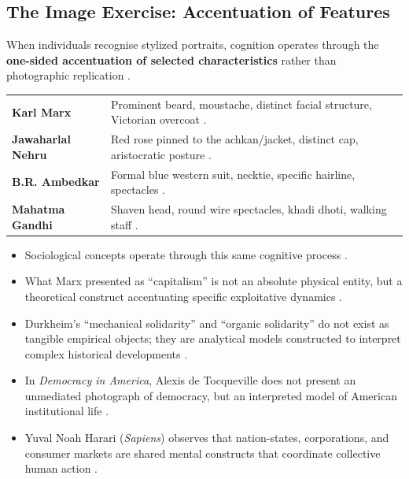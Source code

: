 \subsection{The Image Exercise: Accentuation of Features}

When individuals recognise stylized portraits, cognition operates through the \textbf{one-sided accentuation of selected characteristics} rather than photographic replication .

\begin{table}[htbp]
\centering
\begin{tabularx}{\textwidth}{p{4cm} Y}
\hline
{}
 &  \\
\hline
\textbf{Karl Marx} & Prominent beard, moustache, distinct facial structure, Victorian overcoat . \\
\textbf{Jawaharlal Nehru} & Red rose pinned to the achkan/jacket, distinct cap, aristocratic posture . \\
\textbf{B.R. Ambedkar} & Formal blue western suit, necktie, specific hairline, spectacles . \\
\textbf{Mahatma Gandhi} & Shaven head, round wire spectacles, khadi dhoti, walking staff . \\
\hline
\end{tabularx}
\end{table}

\begin{CriticalPoint}
\begin{itemize}
    \item Sociological concepts operate through this same cognitive process .
    \item What Marx presented as ``capitalism'' is not an absolute physical entity, but a theoretical construct accentuating specific exploitative dynamics .
    \item Durkheim's ``mechanical solidarity'' and ``organic solidarity'' do not exist as tangible empirical objects; they are analytical models constructed to interpret complex historical developments .
\end{itemize}
\end{CriticalPoint}

\begin{ExampleBox}
\begin{itemize}
    \item In \textit{Democracy in America}, Alexis de Tocqueville does not present an unmediated photograph of democracy, but an interpreted model of American institutional life .
    \item Yuval Noah Harari (\textit{Sapiens}) observes that nation-states, corporations, and consumer markets are shared mental constructs that coordinate collective human action .
\end{itemize}
\end{ExampleBox}

